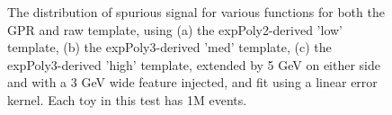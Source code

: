\begin{figure} 
\begin{center}

\caption{The distribution of spurious signal for various functions for both the GPR and raw template, using (a) the expPoly2-derived 'low' template, (b) the expPoly3-derived 'med' template, (c) the expPoly3-derived 'high' template, extended by 5 GeV on either side and with a 3 GeV wide feature injected, and fit using a linear error kernel. Each toy in this test has 1M events.}
\label{fig:linearkernel_lowpt_1M_Sig}
\end{center}
\end{figure}

